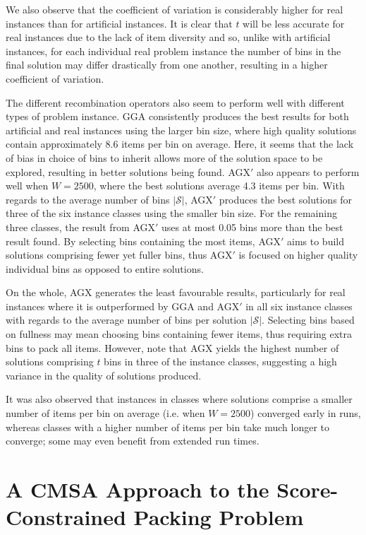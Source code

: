 \documentclass[a4paper,11pt,authoryear]{elsarticle}
\newcommand{\rev}[1]{{\color{myRed}#1}}
\begin{document}
We also observe that the coefficient of variation is considerably higher for real instances than for artificial instances. It is clear that $t$ will be less accurate for real instances due to the lack of item diversity and so, unlike with artificial instances, for each individual real problem instance the number of bins in the final solution may differ drastically from one another, resulting in a higher coefficient of variation.

The different recombination operators also seem to perform well with different types of problem instance. GGA consistently produces the best results for both artificial and real instances using the larger bin size, where high quality solutions contain approximately 8.6 items per bin on average. Here, it seems that the lack of bias in choice of bins to inherit allows more of the solution space to be explored, resulting in better solutions being found. AGX$'$ also appears to perform well when $W=2500$, where the best solutions average 4.3 items per bin. With regards to the average number of bins $|\mathcal{S}|$, AGX$'$ produces the best solutions for three of the six instance classes using the smaller bin size. For the remaining three classes, the result from AGX$'$ uses at most 0.05 bins more than the best result found. By selecting bins containing the most items, AGX$'$ aims to build solutions comprising fewer yet fuller bins, thus AGX$'$ is focused on higher quality individual bins as opposed to entire solutions.

On the whole, AGX generates the least favourable results, particularly for real instances where it is outperformed by GGA and AGX$'$ in all six instance classes with regards to the average number of bins per solution $|\mathcal{S}|$. Selecting bins based on fullness may mean choosing bins containing fewer items, thus requiring extra bins to pack all items. However, note that AGX yields the highest number of solutions comprising $t$ bins in three of the instance classes, suggesting a high variance in the quality of solutions produced.

\rev{It was also observed that instances in classes where solutions comprise a smaller number of items per bin on average (i.e. when $W=2500$) converged early in runs, whereas classes with a higher number of items per bin take much longer to converge; some may even benefit from extended run times.}

\section{A CMSA Approach to the Score-Constrained Packing Problem}
\label{sec:cmsa}
\end{document}
